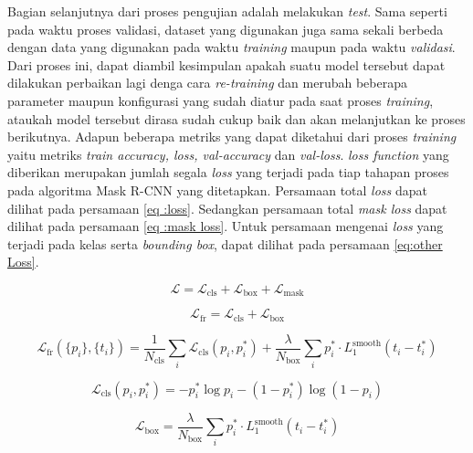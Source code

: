 Bagian selanjutnya dari proses pengujian adalah melakukan \textit{test}. Sama seperti pada waktu proses validasi, 
dataset yang digunakan juga sama sekali berbeda dengan data yang digunakan pada waktu \textit{training} maupun 
pada waktu \textit{validasi}. Dari proses ini, dapat diambil kesimpulan apakah suatu model tersebut dapat 
dilakukan perbaikan lagi denga cara \textit{re-training} dan merubah beberapa parameter maupun konfigurasi 
yang sudah diatur pada saat proses \textit{training}, ataukah model tersebut dirasa sudah cukup baik dan akan 
melanjutkan ke proses berikutnya. Adapun beberapa metriks yang dapat diketahui dari proses 
\textit{training} yaitu metriks \textit{train accuracy, loss, val-accuracy} dan \textit{val-loss}.
\textit{loss function} yang diberikan merupakan jumlah segala \textit{loss} yang terjadi pada tiap tahapan
proses pada algoritma Mask R-CNN yang ditetapkan. Persamaan total \textit{loss} dapat dilihat pada persamaan
\ref{eq :loss}. Sedangkan persamaan total \textit{mask loss} dapat dilihat pada persamaan \ref{eq :mask loss}. Untuk
persamaan mengenai \textit{loss} yang terjadi pada kelas serta \textit{bounding box}, dapat dilihat pada
persamaan \ref{eq:other Loss}.

\begin{equation}
  \label{eq :loss}
  \mathcal{L} = \mathcal{L}_\text{cls} + \mathcal{L}_\text{box} + \mathcal{L}_\text{mask}
\end{equation}

\begin{equation}
  \label{eq:other Loss}
  \mathcal{L}_\text{fr} = \mathcal{L}_\text{cls} + \mathcal{L}_\text{box}
\end{equation}

\begin{equation}
  \mathcal{L}_\text{fr}(\{p_i\}, \{t_i\}) = \frac{1}{N_\text{cls}} \sum_i \mathcal{L}_\text{cls} (p_i, p^*_i) + \frac{\lambda}{N_\text{box}} \sum_i p^*_i \cdot L_1^\text{smooth}(t_i - t^*_i)
\end{equation}

\begin{equation}
  \label{eq :cls_loss}
  \mathcal{L}_\text{cls} (p_i, p^*_i) = - p^*_i \log p_i - (1 - p^*_i) \log (1 - p_i)
\end{equation}

\begin{equation}
  \label{eq :bbox loss}
  \mathcal{L}_\text{box} = \frac{\lambda}{N_\text{box}} \sum_i p^*_i \cdot L_1^\text{smooth}(t_i - t^*_i)
\end{equation}

